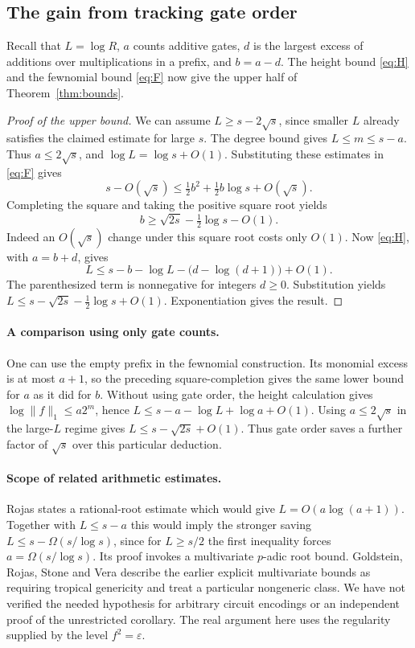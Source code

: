 \documentclass[11pt,letterpaper]{article}
\begin{document}
\clearpage
\subsection{The gain from tracking gate order}\label{sec:gain}
Recall that \(L=\log R\), \(a\) counts additive gates, \(d\) is the largest
excess of additions over multiplications in a prefix, and \(b=a-d\).
The height bound \eqref{eq:H} and the fewnomial bound \eqref{eq:F} now
give the upper half of Theorem~\ref{thm:bounds}.

\begin{proof}[Proof of the upper bound]
We can assume \(L\ge s-2\sqrt{s}\), since smaller \(L\) already satisfies
the claimed estimate for large \(s\). The degree bound gives \(L\le m\le s-a\).
Thus \(a\le 2\sqrt{s}\), and \(\log L=\log s+O(1)\).
Substituting these estimates in \eqref{eq:F} gives
\[
 s-O(\sqrt{s})\le \tfrac12 b^2+\tfrac12 b\log s+O(\sqrt{s}).
\]
Completing the square and taking the positive square root yields
\[
 b\ge\sqrt{2s}-\tfrac12\log s-O(1).
\]
Indeed an \(O(\sqrt{s})\) change under this square root costs only \(O(1)\).
Now \eqref{eq:H}, with \(a=b+d\), gives
\[
 L\le s-b-\log L-\bigl(d-\log(d+1)\bigr)+O(1).
\]
The parenthesized term is nonnegative for integers \(d\ge0\).
Substitution yields \(L\le s-\sqrt{2s}-\tfrac12\log s+O(1)\).
Exponentiation gives the result.
\end{proof}

\paragraph{A comparison using only gate counts.}
One can use the empty prefix in the fewnomial construction. Its monomial
excess is at most \(a+1\), so the preceding square-completion gives the
same lower bound for \(a\) as it did for \(b\). Without using gate order,
the height calculation gives \(\log\|f\|_1\le a2^m\), hence
\(L\le s-a-\log L+\log a+O(1)\). Using \(a\le 2\sqrt{s}\) in the
large-\(L\) regime gives \(L\le s-\sqrt{2s}+O(1)\). Thus gate order
saves a further factor of \(\sqrt{s}\) over this particular deduction.

\paragraph{Scope of related arithmetic estimates.}
Rojas \cite{Rojas} states a rational-root estimate which would give
\(L=O(a\log(a+1))\). Together with \(L\le s-a\) this would imply the
stronger saving \(L\le s-\Omega(s/\log s)\), since for \(L\ge s/2\) the
first inequality forces \(a=\Omega(s/\log s)\). Its proof invokes a multivariate
\(p\)-adic root bound. Goldstein, Rojas, Stone and Vera \cite{GRSV}
describe the earlier explicit multivariate bounds as requiring tropical
genericity and treat a particular nongeneric class. We have not verified
the needed hypothesis for arbitrary circuit encodings or an independent
proof of the unrestricted corollary. The real argument here uses the
regularity supplied by the level \(f^2=\varepsilon\).
\end{document}
